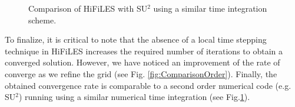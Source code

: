 \begin{figure}
\begin{center}
\begin{minipage}[t]{0.48\columnwidth}
\caption{Comparison of HiFiLES with SU$^2$ using a similar time integration scheme.}
\label{fig:Comparison_SecondOrder}
\end{minipage}
\end{center}
\end{figure}

To finalize, it is critical to note that the absence of a local time stepping technique in HiFiLES increases the required number of iterations to obtain a converged solution. However, we have noticed an improvement of the rate of converge as we refine the grid (see Fig. \ref{fig:ComparisonOrder}). Finally, the obtained convergence rate is comparable to a second order numerical code (e.g. SU$^2$\cite{palacios13,palacios14}) running using a similar numerical time integration (see Fig.\ref{fig:Comparison_SecondOrder}).

